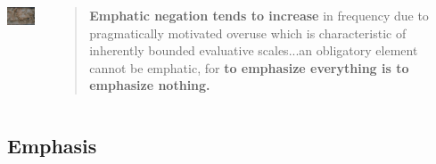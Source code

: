 \documentclass[compress]{beamer}
\begin{document}

\begin{frame}{\cite{kiparsky-condoravdi:2006}}
\begin{columns}[T] 
   \begin{column}{.25\textwidth}
	  \vspace{20pt}
	  \includegraphics[width=1.2in]{epic_cycle.jpg}   
   \end{column}
   \begin{column}{.7\textwidth}
      \begin{block}{}
       \begin{quote}
        	    \textbf{Emphatic negation tends to increase} in frequency due to pragmatically motivated overuse which is characteristic of inherently bounded evaluative scales...an obligatory element cannot be emphatic, for \textbf{to emphasize everything is to emphasize nothing.}
       \end{quote}
      \end{block}
    \end{column}
  \end{columns}
\end{frame}


\subsection{Emphasis}
\end{document}
